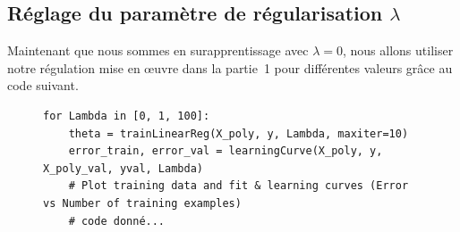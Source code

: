 \subsection{Réglage du paramètre de régularisation $\lambda$}\label{sec:select-lambda}

Maintenant que nous sommes en surapprentissage avec $\lambda = 0$, nous allons utiliser notre régulation mise en œuvre dans la partie~1 pour différentes valeurs grâce au code suivant.


\begin{figure}[!h]
\begin{verbatim}
for Lambda in [0, 1, 100]:
    theta = trainLinearReg(X_poly, y, Lambda, maxiter=10)
    error_train, error_val = learningCurve(X_poly, y, X_poly_val, yval, Lambda)
    # Plot training data and fit & learning curves (Error vs Number of training examples)
    # code donné...
\end{verbatim}   
\end{figure}
    


